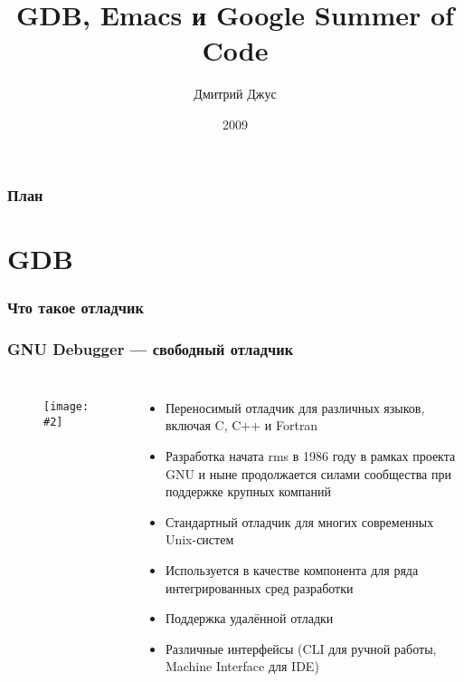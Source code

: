 \documentclass[onlymath]{beamer}
\title{GDB, Emacs и Google Summer of Code }
\author{Дмитрий Джус}
\institute{МГТУ им. Н.Э.Баумана}
\date{2009}
\newcommand{\cenfig}[2]{\begin{figure}\centering\texttt{[image: \#2]}
  \end{figure}}
\begin{document}
\begin{frame}
  \titlepage
\end{frame}

\begin{frame}
  \frametitle{План}
  \tableofcontents
\end{frame}

\section{GDB}

\begin{frame}
  \frametitle{Что такое отладчик}
\end{frame}

\begin{frame}
  \frametitle{GNU Debugger — свободный отладчик}
  \begin{columns}
    \cenfig{0.5}{archer.jpg}

  \begin{itemize}
  \item Переносимый отладчик для различных языков, включая C, C++ и Fortran
  \item Разработка начата rms в 1986 году в рамках проекта GNU и ныне
    продолжается силами сообщества при поддержке крупных компаний
  \item Стандартный отладчик для многих современных Unix-систем
  \item Используется в качестве компонента для ряда интегрированных
    сред разработки
  \item Поддержка удалённой отладки
  \item Различные интерфейсы (CLI для ручной работы, Machine Interface
    для IDE)
  \end{itemize}
\end{columns}
\end{frame}
\end{document}

